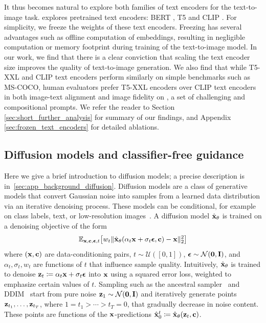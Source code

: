 It thus becomes natural to explore both families of text encoders for the text-to-image task. \name explores pretrained text encoders: BERT \cite{devlin-naacl-2019}, T5 \cite{raffel-icml-2017} and CLIP \cite{radford-arxiv-2017}. For simplicity, we freeze the weights of these text encoders. Freezing has several advantages such as offline computation of embeddings, resulting in negligible computation or memory footprint during training of the text-to-image model. In our work, we find that there is a clear conviction that scaling the text encoder size improves the quality of text-to-image generation. We also find that while T5-XXL and CLIP text encoders perform similarly on simple benchmarks such as MS-COCO, human evaluators prefer T5-XXL encoders over CLIP text encoders in both image-text alignment and image fidelity on \benchmarkname, a set of challenging and compositional prompts. We refer the reader to Section \ref{sec:short_further_analysis} for summary of our findings, and Appendix \ref{sec:frozen_text_encoders} for detailed ablations.



\subsection{Diffusion models and classifier-free guidance}
\vspace{-0.15cm}
Here we give a brief introduction to diffusion models; a precise description is  in~\cref{sec:app_background_diffusion}. Diffusion models \citep{sohl2015deep, ho2020denoising, song2019generative} are a class of generative models that convert Gaussian noise into samples from a learned data distribution via an iterative denoising process. These models can be conditional, for example on class labels, text, or low-resolution images~\citep[e.g.][]{dhariwal2021diffusion,ho2021cascaded,saharia2021image,sahariac-palette,whang2021deblurring,nichol-glide,ramesh-dalle2}.
A diffusion model $\hat{\mathbf{x}}_\theta$ is trained on a denoising objective of the form
\begin{align}
    \mathbb{E}_{\mathbf{x},\mathbf{c},{\boldsymbol{\epsilon}},t}\!\left[w_t \|\hat{\mathbf{x}}_\theta(\alpha_t \mathbf{x} + \sigma_t {\boldsymbol{\epsilon}}, \mathbf{c}) - \mathbf{x} \|^2_2\right]
\end{align}
where $(\mathbf{x}, \mathbf{c})$ are data-conditioning pairs, $t \sim \mathcal{U}([0, 1])$, ${\boldsymbol{\epsilon}} \sim \mathcal{N}(\mathbf{0}, \mathbf{I})$, and $\alpha_t, \sigma_t, w_t$ are functions of $t$ that influence sample quality. Intuitively, $\hat{\mathbf{x}}_\theta$ is trained to denoise $\mathbf{z}_t \coloneqq \alpha_t \mathbf{x} + \sigma_t {\boldsymbol{\epsilon}}$ into $\mathbf{x}$ using a squared error loss, weighted to emphasize certain values of $t$. 
Sampling such as the ancestral sampler~\citep{ho2020denoising} and DDIM~\citep{song2020denoising} start from pure noise $\mathbf{z}_1 \sim \mathcal{N}(\mathbf{0}, \mathbf{I})$ and iteratively generate points $\mathbf{z}_{t_1}, \dotsc, \mathbf{z}_{t_T}$, where $1 = t_1 > \cdots > t_T = 0$, that gradually decrease in noise content. These points are functions of the $\mathbf{x}$-predictions $\hat{\mathbf{x}}^t_0 \coloneqq \hat{\mathbf{x}}_\theta(\mathbf{z}_t, \mathbf{c})$. %



